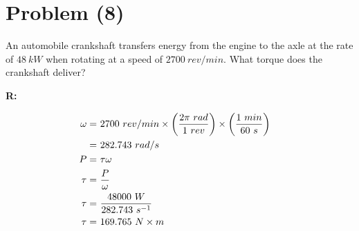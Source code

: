 \section{Problem (8)}
	An automobile crankshaft transfers energy from the engine to the axle at the rate of $48 \ kW$ when rotating at a speed of $2700 \ rev/min$. What torque does the crankshaft deliver?

	\textbf{R:}

	\begin{align}
		\omega = \ &2700 \ rev/min
		\times \left( \frac{2 \pi \ rad}{1 \ rev} \right)
		\times \left( \frac{1 \ min}{60 \ s} \right)& \notag \\
		= \ &282.743 \ rad/s& \notag \\
		P = \ &\tau \omega& \notag \\
		\tau = \ &\frac{P}{\omega}& \notag \\
		\tau = \ &\frac{48000 \ W}{282.743 \ s^{-1}}& \notag \\
		\tau = \ &169.765 \ N \times m&
	\end{align}
